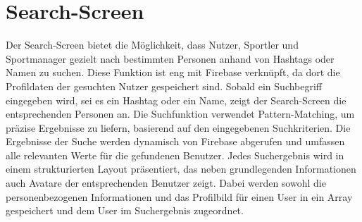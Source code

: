 \chapter{Search-Screen}
Der Search-Screen bietet die Möglichkeit, dass Nutzer, Sportler und Sportmanager gezielt nach bestimmten Personen anhand von Hashtags oder Namen zu suchen. 
Diese Funktion ist eng mit Firebase verknüpft, da dort die Profildaten der gesuchten Nutzer gespeichert sind.
Sobald ein Suchbegriff eingegeben wird, sei es ein Hashtag oder ein Name, zeigt der Search-Screen die entsprechenden Personen an.
Die Suchfunktion verwendet Pattern-Matching, um präzise Ergebnisse zu liefern, basierend auf den eingegebenen Suchkriterien.
Die Ergebnisse der Suche werden dynamisch von Firebase abgerufen und umfassen alle relevanten Werte für die gefundenen Benutzer.
Jedes Suchergebnis wird in einem strukturierten Layout präsentiert, das neben grundlegenden Informationen auch Avatare der entsprechenden Benutzer zeigt.
Dabei werden sowohl die personenbezogenen Informationen und das Profilbild für einen User in ein Array gespeichert und dem User im Suchergebnis zugeordnet.